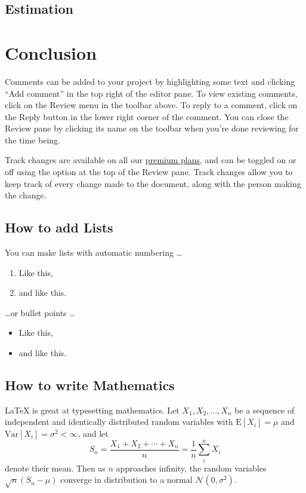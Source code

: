 \documentclass{article}
\begin{document}
\begin{Data science tools for finance final project}
\subsection{Estimation}



\section{Conclusion}

Comments can be added to your project by highlighting some text and clicking ``Add comment'' in the top right of the editor pane. To view existing comments, click on the Review menu in the toolbar above. To reply to a comment, click on the Reply button in the lower right corner of the comment. You can close the Review pane by clicking its name on the toolbar when you're done reviewing for the time being.

Track changes are available on all our \href{https://www.overleaf.com/user/subscription/plans}{premium plans}, and can be toggled on or off using the option at the top of the Review pane. Track changes allow you to keep track of every change made to the document, along with the person making the change. 

\subsection{How to add Lists}

You can make lists with automatic numbering \dots

\begin{enumerate}
\item Like this,
\item and like this.
\end{enumerate}
\dots or bullet points \dots
\begin{itemize}
\item Like this,
\item and like this.
\end{itemize}



\subsection{How to write Mathematics}

\LaTeX{} is great at typesetting mathematics. Let $X_1, X_2, \ldots, X_n$ be a sequence of independent and identically distributed random variables with $\text{E}[X_i] = \mu$ and $\text{Var}[X_i] = \sigma^2 < \infty$, and let
\[S_n = \frac{X_1 + X_2 + \cdots + X_n}{n}
      = \frac{1}{n}\sum_{i}^{n} X_i\]
denote their mean. Then as $n$ approaches infinity, the random variables $\sqrt{n}(S_n - \mu)$ converge in distribution to a normal $\mathcal{N}(0, \sigma^2)$.



\end{Data science tools for finance final project}
\end{document}
